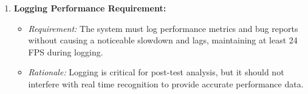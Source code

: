 \documentclass{scrreprt}
\begin{document}
\begin{enumerate}
\begin{itemize}
                \end{itemize}
            \item \textbf{Logging Performance Requirement:}
                \begin{itemize}
                    \item \textit{Requirement:} The system must log performance metrics and bug reports without causing a noticeable slowdown and lags, maintaining at least 24 FPS during logging.
                    \item \textit{Rationale:} Logging is critical for post-test analysis, but it should not interfere with real time recognition to provide accurate performance data.
                \end{itemize}
        \end{enumerate}
    
\end{document}
